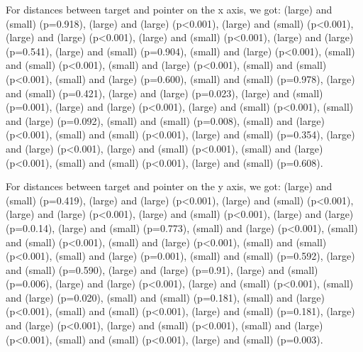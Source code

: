 For distances between target and pointer on the x axis, we got: 
\pinch(large) and \pinch(small) (p=0.918), \pinch(large) and \swipe(large) (p<0.001), \pinch(large) and \swipe(small) (p<0.001), \pinch(large) and \throw(large) (p<0.001), \pinch(large) and \throw(small) (p<0.001), \pinch(large) and \tilt(large) (p=0.541), \pinch(large) and \tilt(small) (p=0.904), \pinch(small) and \swipe(large) (p<0.001), \pinch(small) and \swipe(small) (p<0.001), \pinch(small) and \throw(large) (p<0.001), \pinch(small) and \throw(small) (p<0.001), \pinch(small) and \tilt(large) (p=0.600), \pinch(small) and \tilt(small) (p=0.978), \swipe(large) and \swipe(small) (p=0.421), \swipe(large) and \throw(large) (p=0.023), \swipe(large) and \throw(small) (p=0.001), \swipe(large) and \tilt(large) (p<0.001), \swipe(large) and \tilt(small) (p<0.001), \swipe(small) and \throw(large) (p=0.092), \swipe(small) and \throw(small) (p=0.008), \swipe(small) and \tilt(large) (p<0.001), \swipe(small) and \tilt(small) (p<0.001), \throw(large) and \throw(small) (p=0.354), \throw(large) and \tilt(large) (p<0.001), \throw(large) and \tilt(small) (p<0.001), \throw(small) and \tilt(large) (p<0.001), \throw(small) and \tilt(small) (p<0.001), \tilt(large) and \tilt(small) (p=0.608).

For distances between target and pointer on the y axis, we got: 
\pinch(large) and \pinch(small) (p=0.419), \pinch(large) and \swipe(large) (p<0.001), \pinch(large) and \swipe(small) (p<0.001), \pinch(large) and \throw(large) (p<0.001), \pinch(large) and \throw(small) (p<0.001), \pinch(large) and \tilt(large) (p=0.0.14), \pinch(large) and \tilt(small) (p=0.773), \pinch(small) and \swipe(large) (p<0.001), \pinch(small) and \swipe(small) (p<0.001), \pinch(small) and \throw(large) (p<0.001), \pinch(small) and \throw(small) (p<0.001), \pinch(small) and \tilt(large) (p=0.001), \pinch(small) and \tilt(small) (p=0.592), \swipe(large) and \swipe(small) (p=0.590), \swipe(large) and \throw(large) (p=0.91), \swipe(large) and \throw(small) (p=0.006), \swipe(large) and \tilt(large) (p<0.001), \swipe(large) and \tilt(small) (p<0.001), \swipe(small) and \throw(large) (p=0.020), \swipe(small) and \throw(small) (p=0.181), \swipe(small) and \tilt(large) (p<0.001), \swipe(small) and \tilt(small) (p<0.001), \throw(large) and \throw(small) (p=0.181), \throw(large) and \tilt(large) (p<0.001), \throw(large) and \tilt(small) (p<0.001), \throw(small) and \tilt(large) (p<0.001), \throw(small) and \tilt(small) (p<0.001), \tilt(large) and \tilt(small) (p=0.003).